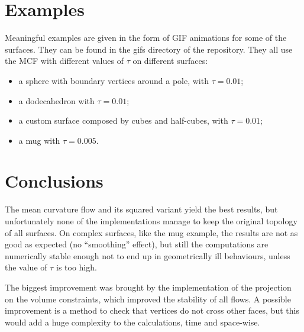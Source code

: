 \documentclass{article}
\begin{document}
\section*{Examples}
Meaningful examples are given in the form of GIF animations for some of the surfaces.
They can be found in the gifs directory of the repository. They all use the
MCF with different values of $\tau$ on different surfaces:
\begin{itemize}
  \item a sphere with boundary vertices around a pole, with $\tau = 0.01$;
  \item a dodecahedron with $\tau = 0.01$;
  \item a custom surface composed by cubes and half-cubes, with $\tau = 0.01$;
  \item a mug with $\tau = 0.005$.
\end{itemize}

\section*{Conclusions}
The mean curvature flow and its squared variant yield the best results, but
unfortunately none of the implementations manage to keep the original topology of
all surfaces. On complex surfaces, like the mug example, the results are
not as good as expected (no ``smoothing'' effect), but still the computations
are numerically stable enough not to end up in geometrically ill behaviours,
unless the value of $\tau$ is too high.

The biggest improvement was brought by the implementation of the projection
on the volume constraints, which improved the stability of all flows.
A possible improvement is a method to check that vertices do not cross other
faces, but this would add a huge complexity to the calculations, time and space-wise.
\end{document}
